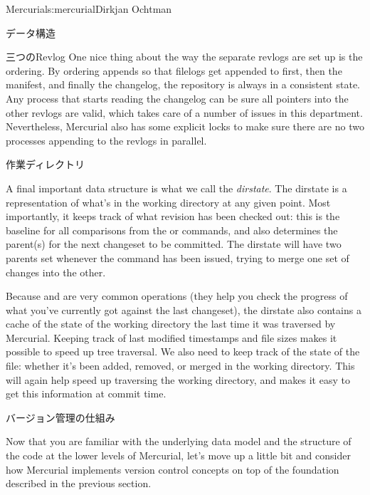 \begin{aosachapter}{Mercurial}{s:mercurial}{Dirkjan Ochtman}
\begin{aosasect1}{データ構造}
\begin{aosasect2}{三つのRevlog}
One nice thing about the way the separate revlogs are set up is the
ordering. By ordering appends so that filelogs get appended to first,
then the manifest, and finally the changelog, the repository is always
in a consistent state. Any process that starts reading the changelog
can be sure all pointers into the other revlogs are valid, which takes
care of a number of issues in this department. Nevertheless, Mercurial
also has some explicit locks to make sure there are no two processes
appending to the revlogs in parallel.

\end{aosasect2}

\begin{aosasect2}{作業ディレクトリ}

A final important data structure is what we call the
\emph{dirstate}. The dirstate is a representation of what's in the
working directory at any given point. Most importantly, it keeps track
of what revision has been checked out: this is the baseline for all
comparisons from the  or  commands, and also
determines the parent(s) for the next changeset to be committed. The
dirstate will have two parents set whenever the  command
has been issued, trying to merge one set of changes into the other.

Because  and  are very common operations (they
help you check the progress of what you've currently got against the
last changeset), the dirstate also contains a cache of the state of
the working directory the last time it was traversed by Mercurial.
Keeping track of last modified timestamps and file sizes makes it
possible to speed up tree traversal. We also need to keep track of the
state of the file: whether it's been added, removed, or merged in the
working directory. This will again help speed up traversing the
working directory, and makes it easy to get this information at commit
time.

\end{aosasect2}

\end{aosasect1}

\begin{aosasect1}{バージョン管理の仕組み}

Now that you are familiar with the underlying data model and the
structure of the code at the lower levels of Mercurial, let's move up
a little bit and consider how Mercurial implements version control
concepts on top of the foundation described in the previous section.


\end{aosasect1}
\end{aosachapter}
